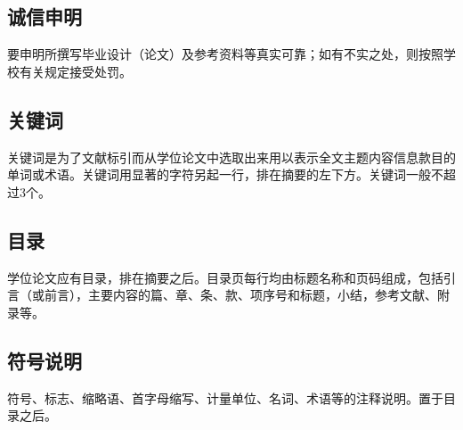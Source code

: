 \documentclass{bucthesis}
\begin{document}
\subsection{诚信申明}{\par
	要申明所撰写毕业设计（论文）及参考资料等真实可靠；如有不实之处，则按照学校有关规定接受处罚。\par}
\subsection{关键词}{\par
	关键词是为了文献标引而从学位论文中选取出来用以表示全文主题内容信息款目的单词或术语。关键词用显著的字符另起一行，排在摘要的左下方。关键词一般不超过3个。\par}
\subsection{目录}{\par
	学位论文应有目录，排在摘要之后。目录页每行均由标题名称和页码组成，包括引言（或前言），主要内容的篇、章、条、款、项序号和标题，小结，参考文献、附录等。\par}
\subsection{符号说明}{\par
	符号、标志、缩略语、首字母缩写、计量单位、名词、术语等的注释说明。置于目录之后。\par}
\end{document}

